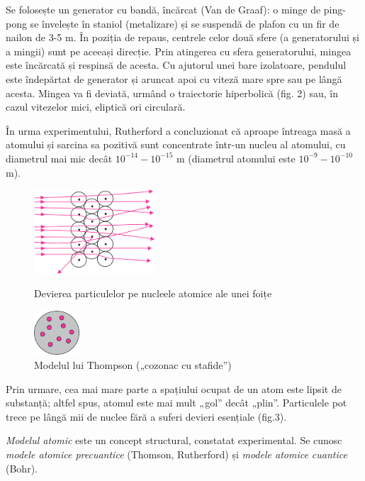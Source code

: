Se folosește un generator cu bandă, încărcat (Van de Graaf): o minge de
ping-pong se învelește în staniol (metalizare) și se suspendă de plafon cu un
fir de nailon de 3-5 m. În poziția de repaus, centrele celor două sfere (a
generatorului și a mingii) sunt pe aceeași direcție. Prin atingerea cu sfera
generatorului, mingea este încărcată și respinsă de acesta. Cu ajutorul unei
bare izolatoare, pendulul este îndepărtat de generator și aruncat apoi cu
viteză mare spre sau pe lângă acesta. Mingea va fi deviată, urmând o
traiectorie hiperbolică (fig. 2) sau, în cazul vitezelor
mici, eliptică ori circulară.

\clearpage

În urma experimentului, Rutherford a concluzionat că aproape întreaga masă a
atomului și sarcina sa pozitivă sunt concentrate într-un nucleu al atomului, cu
diametrul mai mic decât $10^{-14} - 10^{-15}$ m (diametrul atomului este
$10^{-9} - 10^{-10}$ m).

\begin{figure}
    \centering
    \includegraphics[width=0.4\textwidth]{fig/deviere}
    \caption{Devierea particulelor {\alpha} pe nucleele atomice ale unei foițe}
    \vspace{0.5cm}
    \includegraphics[width=0.15\textwidth]{fig/thomson}
    \captionsetup{width=5cm}
    \caption{Modelul lui Thompson („cozonac cu stafide”)}
\end{figure}

Prin urmare, cea mai mare parte a spațiului ocupat de un atom este lipsit de
substanță; altfel spus, atomul este mai mult „gol” decât „plin”. Particulele
{\alpha} pot trece pe lângă mii de nuclee fără a suferi devieri esențiale
(fig.3).

\emph{Modelul atomic} este un concept structural, constatat experimental. Se
cunosc \emph{modele atomice precuantice} (Thomson, Rutherford) și
\emph{modele atomice cuantice} (Bohr).

